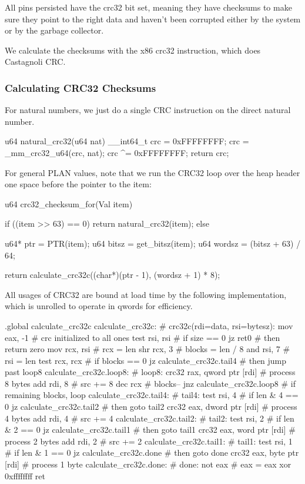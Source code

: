 All pins persisted have the crc32 bit set, meaning they have checksums to make
sure they point to the right data and haven't been corrupted either by the
system or by the garbage collector.

We calculate the checksums with the x86 crc32 instruction, which does
Castagnoli CRC.

\subsubsection{Calculating CRC32 Checksums}

For natural numbers, we just do a single CRC instruction on the direct natural
number.

\begin{clang}
u64 natural_crc32(u64 nat) {
  __int64_t crc = 0xFFFFFFFF;
  crc = _mm_crc32_u64(crc, nat);
  crc ^= 0xFFFFFFFF;
  return crc;
}
\end{clang}

For general PLAN values, note that we run the CRC32 loop over the heap header
one space before the pointer to the item:

\begin{clang}
u64 crc32_checksum_for(Val item) {
  if ((item >> 63) == 0) {
    return natural_crc32(item);
  } else {
    u64* ptr = PTR(item);
    u64 bitsz = get_bitsz(item);
    u64 wordsz = (bitsz + 63) / 64;

    return calculate_crc32c((char*)(ptr - 1), (wordsz + 1) * 8);
  }
}
\end{clang}

All usages of CRC32 are bound at load time by the following implementation,
which is unrolled to operate in qwords for efficiency.

\begin{asm}
.global calculate_crc32c
calculate_crc32c:			     # crc32c(rdi=data, rsi=bytesz):
	mov	eax, -1			     #   crc initialized to all ones
	test	rsi, rsi		     #   if size == 0
	jz	ret0			     #   then return zero
	mov	rcx, rsi		     #   rcx = len
	shr	rcx, 3			     #   blocks = len / 8
	and	rsi, 7			     #   rsi = len %
	test	rcx, rcx		     #   if blocks == 0
	jz	calculate_crc32c.tail4	     #   then jump past loop8
calculate_crc32c.loop8:			     # loop8:
	crc32	rax, qword ptr [rdi]	     #   process 8 bytes
	add	rdi, 8			     #   src += 8
	dec	rcx			     #   blocks--
	jnz	calculate_crc32c.loop8	     #   if remaining blocks, loop
calculate_crc32c.tail4:			     # tail4:
	test	rsi, 4			     #   if len & 4 == 0
	jz	calculate_crc32c.tail2	     #   then goto tail2
	crc32	eax, dword ptr [rdi]	     #   process 4 bytes
	add	rdi, 4			     #   src += 4
calculate_crc32c.tail2:			     # tail2:
	test	rsi, 2			     #   if len & 2 == 0
	jz	calculate_crc32c.tail1	     #   then goto tail1
	crc32	eax, word ptr [rdi]	     #   process 2 bytes
	add	rdi, 2			     #   src += 2
calculate_crc32c.tail1:			     # tail1:
	test	rsi, 1			     #   if len & 1 == 0
	jz	calculate_crc32c.done	     #   then goto done
	crc32	eax, byte ptr [rdi]	     #   process 1 byte
calculate_crc32c.done:			     # done:
	not	eax			     #   eax = eax xor 0xffffffff
	ret
\end{asm}

